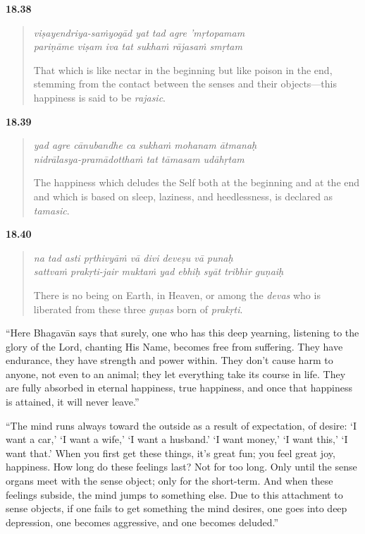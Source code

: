 \par\noindent\textbf{18.38}\par
\begin{verse}
\textit{viṣayendriya-saṁyogād yat tad agre ’mṛtopamam} \\
\textit{pariṇāme viṣam iva tat sukhaṁ rājasaṁ smṛtam}

\noindent That which is like nectar in the beginning but like poison in the end, stemming from the contact between the senses and their objects---this happiness is said to be \textit{rajasic}.
\end{verse}
\par



\par\noindent\textbf{18.39}\par
\begin{verse}
\textit{yad agre cānubandhe ca sukhaṁ mohanam ātmanaḥ} \\
\textit{nidrālasya-pramādotthaṁ tat tāmasam udāhṛtam}

\noindent The happiness which deludes the Self both at the beginning and at the end and which is based on sleep, laziness, and heedlessness, is declared as \textit{tamasic}.
\end{verse}
\par



\par\noindent\textbf{18.40}\par
\begin{verse}
\textit{na tad asti pṛthivyāṁ vā divi deveṣu vā punaḥ} \\
\textit{sattvaṁ prakṛti-jair muktaṁ yad ebhiḥ syāt tribhir guṇaiḥ}

\noindent There is no being on Earth, in Heaven, or among the \textit{devas} who is liberated from these three \textit{guṇas} born of \textit{prakṛti}.
\end{verse}
\par


\enquote{Here Bhagavān says that surely, one who has this deep yearning, listening to the glory of the Lord, chanting His Name, becomes free from suffering. They have endurance, they have strength and power within. They don’t cause harm to anyone, not even to an animal; they let everything take its course in life. They are fully absorbed in eternal happiness, true happiness, and once that happiness is attained, it will never leave.}

\enquote{The mind runs always toward the outside as a result of expectation, of desire: \enquote{I want a car,} \enquote{I want a wife,} \enquote{I want a husband.} \enquote{I want money,} \enquote{I want this,} \enquote{I want that.} When you first get these things, it’s great fun; you feel great joy, happiness. How long do these feelings last? Not for too long. Only until the sense organs meet with the sense object; only for the short-term. And when these feelings subside, the mind jumps to something else. Due to this attachment to sense objects, if one fails to get something the mind desires, one goes into deep depression, one becomes aggressive, and one becomes deluded.}

